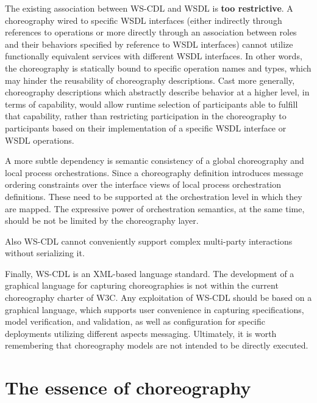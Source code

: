 The existing association between WS-CDL and WSDL is \textbf{too restrictive}. A choreography wired to specific WSDL interfaces (either indirectly through references to operations or more directly through an association between roles and their behaviors specified by reference to WSDL interfaces) cannot utilize functionally equivalent services with different WSDL interfaces. In other words, the choreography is statically bound to specific operation names and types, which may hinder the reusability of choreography descriptions. Cast more generally, choreography descriptions which abstractly describe behavior at a higher level, in terms of capability, would allow runtime selection of participants able to fulfill that capability, rather than restricting participation in the choreography to participants based on their implementation of a specific WSDL interface or WSDL operations.

A more subtle dependency is semantic consistency of a global choreography and local process orchestrations. Since a choreography definition introduces message ordering constraints over the interface views of local process orchestration definitions. These need to be supported at the orchestration level in which they are mapped. The expressive power of orchestration semantics, at the same time, should be not be limited by the choreography layer. \cite{critical-ws-cdl}

Also WS-CDL cannot conveniently support complex multi-party interactions without serializing it.

Finally, WS-CDL is an XML-based language standard. The development of a graphical language for capturing choreographies is not within the current choreography charter of W3C. Any exploitation of WS-CDL should be based on a graphical language, which supports user convenience in capturing specifications, model verification, and validation, as well as configuration for specific deployments utilizing different aspects messaging. Ultimately, it is worth remembering that choreography models are not intended to be directly executed. \cite{critical-ws-cdl}

\section{The essence of choreography}

